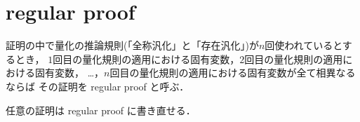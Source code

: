 \section{regular proof}
	
	\begin{screen}
		\begin{metadfn}
			証明の中で量化の推論規則(「全称汎化」と「存在汎化」)が$n$回使われているとするとき，
			$1$回目の量化規則の適用における固有変数，$2$回目の量化規則の適用における固有変数，
			…，$n$回目の量化規則の適用における固有変数が全て相異なるならば
			その証明を regular proof と呼ぶ．
		\end{metadfn}
	\end{screen}
	
	任意の証明は regular proof に書き直せる．
	
